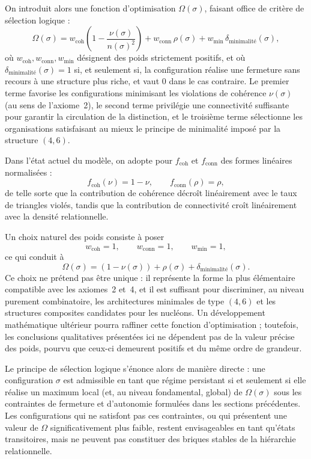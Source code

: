 \documentclass[11pt,a4paper]{article}
\begin{document}
On introduit alors une fonction d’optimisation \(\Omega(\sigma)\), faisant office de critère de sélection logique :
\[
\Omega(\sigma)
= w_{\mathrm{coh}}\!\left(1 - \frac{\nu(\sigma)}{n(\sigma)^2}\right)
+ w_{\mathrm{conn}}\, \rho(\sigma)
+ w_{\mathrm{min}}\, \delta_{\text{minimalité}}(\sigma),
\]
où \(w_{\mathrm{coh}}, w_{\mathrm{conn}}, w_{\mathrm{min}}\) désignent des poids strictement positifs, et où \(\delta_{\text{minimalité}}(\sigma) = 1\) si, et seulement si, la configuration réalise une fermeture sans recours à une structure plus riche, et vaut \(0\) dans le cas contraire. Le premier terme favorise les configurations minimisant les violations de cohérence \(\nu(\sigma)\) (au sens de l’axiome~2), le second terme privilégie une connectivité suffisante pour garantir la circulation de la distinction, et le troisième terme sélectionne les organisations satisfaisant au mieux le principe de minimalité imposé par la structure \((4,6)\).

Dans l’état actuel du modèle, on adopte pour \(f_{\mathrm{coh}}\) et \(f_{\mathrm{conn}}\) des formes linéaires normalisées :
\[
f_{\mathrm{coh}}\left(\nu\right) = 1-\nu,
\qquad
f_{\mathrm{conn}}\left(\rho\right) = \rho,
\]
de telle sorte que la contribution de cohérence décroît linéairement avec le taux de triangles violés, tandis que la contribution de connectivité croît linéairement avec la densité relationnelle.

Un choix naturel des poids consiste à poser
\[
w_{\mathrm{coh}} = 1,
\qquad
w_{\mathrm{conn}} = 1,
\qquad
w_{\mathrm{min}} = 1,
\]
ce qui conduit à
\[
\Omega\left(\sigma\right)
= \left(1-\nu\left(\sigma\right)\right)
+ \rho\left(\sigma\right)
+ \delta_{\text{minimalité}}\!\left(\sigma\right).
\]
Ce choix ne prétend pas être unique : il représente la forme la plus élémentaire compatible avec les axiomes~2 et~4, et il est suffisant pour discriminer, au niveau purement combinatoire, les architectures minimales de type \(\left(4, 6\right)\) et les structures composites candidates pour les nucléons. Un développement mathématique ultérieur pourra raffiner cette fonction d’optimisation ; toutefois, les conclusions qualitatives présentées ici ne dépendent pas de la valeur précise des poids, pourvu que ceux-ci demeurent positifs et du même ordre de grandeur.

Le principe de sélection logique s’énonce alors de manière directe : une configuration \(\sigma\) est admissible en tant que régime persistant si et seulement si elle réalise un maximum local (et, au niveau fondamental, global) de \(\Omega\left(\sigma\right)\) sous les contraintes de fermeture et d’autonomie formulées dans les sections précédentes. Les configurations qui ne satisfont pas ces contraintes, ou qui présentent une valeur de \(\Omega\) significativement plus faible, restent envisageables en tant qu’états transitoires, mais ne peuvent pas constituer des briques stables de la hiérarchie relationnelle.
\end{document}
